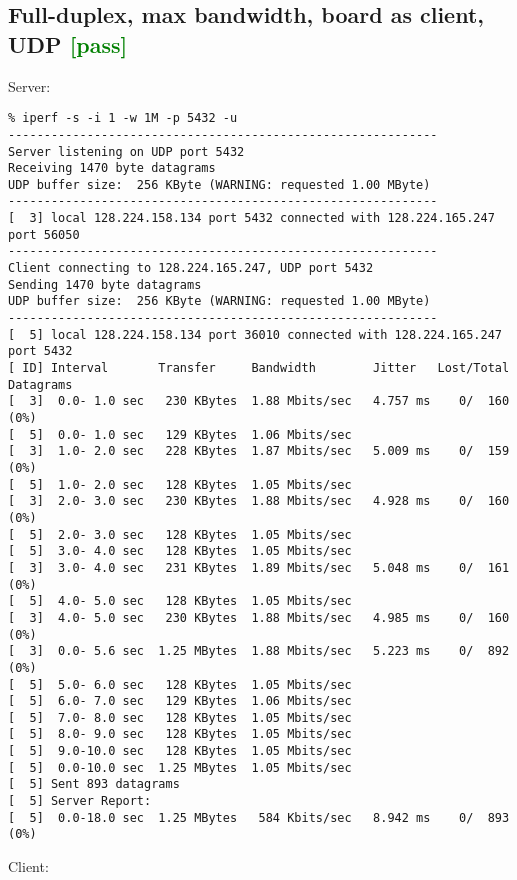 \documentclass[a4paper]{report}
\begin{document}
\subsection{Full-duplex, max bandwidth, board as client, UDP \textcolor{green}{[pass]}}
Server:
\begin{lstlisting}
% iperf -s -i 1 -w 1M -p 5432 -u
------------------------------------------------------------
Server listening on UDP port 5432
Receiving 1470 byte datagrams
UDP buffer size:  256 KByte (WARNING: requested 1.00 MByte)
------------------------------------------------------------
[  3] local 128.224.158.134 port 5432 connected with 128.224.165.247 port 56050
------------------------------------------------------------
Client connecting to 128.224.165.247, UDP port 5432
Sending 1470 byte datagrams
UDP buffer size:  256 KByte (WARNING: requested 1.00 MByte)
------------------------------------------------------------
[  5] local 128.224.158.134 port 36010 connected with 128.224.165.247 port 5432
[ ID] Interval       Transfer     Bandwidth        Jitter   Lost/Total Datagrams
[  3]  0.0- 1.0 sec   230 KBytes  1.88 Mbits/sec   4.757 ms    0/  160 (0%)
[  5]  0.0- 1.0 sec   129 KBytes  1.06 Mbits/sec
[  3]  1.0- 2.0 sec   228 KBytes  1.87 Mbits/sec   5.009 ms    0/  159 (0%)
[  5]  1.0- 2.0 sec   128 KBytes  1.05 Mbits/sec
[  3]  2.0- 3.0 sec   230 KBytes  1.88 Mbits/sec   4.928 ms    0/  160 (0%)
[  5]  2.0- 3.0 sec   128 KBytes  1.05 Mbits/sec
[  5]  3.0- 4.0 sec   128 KBytes  1.05 Mbits/sec
[  3]  3.0- 4.0 sec   231 KBytes  1.89 Mbits/sec   5.048 ms    0/  161 (0%)
[  5]  4.0- 5.0 sec   128 KBytes  1.05 Mbits/sec
[  3]  4.0- 5.0 sec   230 KBytes  1.88 Mbits/sec   4.985 ms    0/  160 (0%)
[  3]  0.0- 5.6 sec  1.25 MBytes  1.88 Mbits/sec   5.223 ms    0/  892 (0%)
[  5]  5.0- 6.0 sec   128 KBytes  1.05 Mbits/sec
[  5]  6.0- 7.0 sec   129 KBytes  1.06 Mbits/sec
[  5]  7.0- 8.0 sec   128 KBytes  1.05 Mbits/sec
[  5]  8.0- 9.0 sec   128 KBytes  1.05 Mbits/sec
[  5]  9.0-10.0 sec   128 KBytes  1.05 Mbits/sec
[  5]  0.0-10.0 sec  1.25 MBytes  1.05 Mbits/sec
[  5] Sent 893 datagrams
[  5] Server Report:
[  5]  0.0-18.0 sec  1.25 MBytes   584 Kbits/sec   8.942 ms    0/  893 (0%)
\end{lstlisting}
Client:
\end{document}
